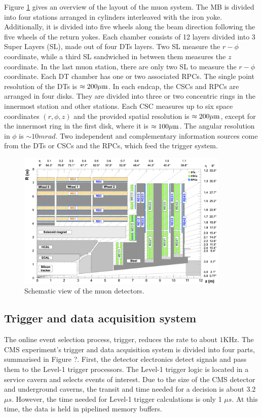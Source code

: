 Figure \ref{fig:muon} gives an overview of the layout of the muon system. The MB is divided into four stations arranged in cylinders interleaved with the iron yoke. Additionally, it is divided into five wheels along the beam direction following the five wheels of the return yokes. Each chamber consists of 12 layers divided into 3 Super Layers (SL), made out of four DTs layers. Two SL measure the $r-\phi$ coordinate, while a third SL sandwiched in between them measures the $z$ coordinate. In the last muon station, there are only two SL to measure the $r-\phi$ coordinate. Each DT chamber has one or two associated RPCs. The single point resolution of the DTs is $\approx 200 \mu \text{m}$. In each endcap, the CSCs and RPCs are arranged in four disks. They are divided into three or two concentric rings in the innermost station and other stations. Each CSC measures up to six space coordinates $(r, \phi, z)$ and the provided spatial resolution is $\approx 200 \mu \text{m}$, except for the innermost ring in the first disk, where it is $\approx 100 \mu \text{m}$. The angular resolution in $\phi$ is $\sim 10 mrad$. Two independent and complementary information sources come from the DTs or CSCs and the RPCs, which feed the trigger system.

\begin{figure}[htbp]
  \centering
  \includegraphics[width=0.9\textwidth]{plots/chapter3/muon.png}
  \caption{Schematic view of the muon detectors.}
  \label{fig:muon}
\end{figure}

\subsection{Trigger and data acquisition system}

The online event selection process, trigger, reduces the rate to about $1 \mathrm{KHz}$. The CMS experiment's trigger and data acquisition system is divided into four parts, summarised in Figure ?. First, the detector electronics detect signals and pass them to the Level-1 trigger processors. The Level-1 trigger logic is located in a service cavern and selects events of interest. Due to the size of the CMS detector and underground caverns, the transit and time needed for a decision is about 3.2 $\mu s$. However, the time needed for Level-1 trigger calculations is only 1 $\mu s$. At this time, the data is held in pipelined memory buffers.

